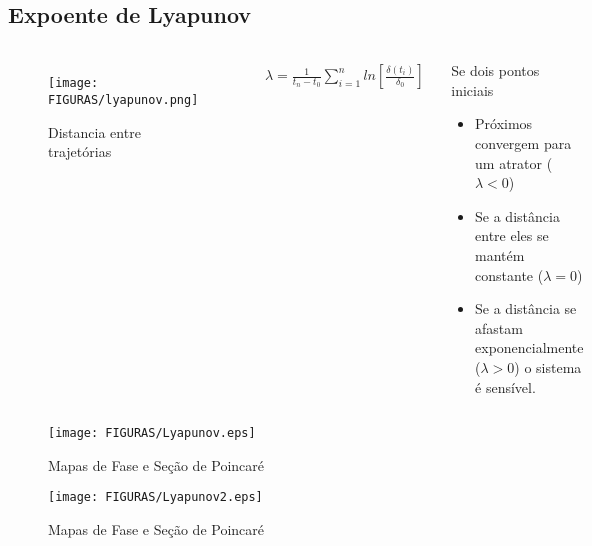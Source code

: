 \documentclass[12pt,aspectratio=169]{beamer}
\begin{document}
\subsection{Expoente de Lyapunov}
\begin{frame}
\begin{columns}
\begin{figure}[h]
\centering
\texttt{[image: FIGURAS/lyapunov.png]} 
\caption{Distancia entre trajetórias}
\label{fig:03}
\end{figure}
\begin{eqnarray}
\lambda = \frac{1}{t_n-t_0}\sum^{n}_{i=1}ln\left[ \frac{\delta(t_i)}{\delta_0} \right]
\end{eqnarray}
\begin{block}{Se dois pontos iniciais}
\begin{itemize}
    \item Próximos convergem para um atrator ($\lambda < 0$)
    \item Se a distância entre eles se mantém constante ($\lambda = 0$)
    \item Se a distância se afastam exponencialmente ($\lambda > 0$) o sistema é sensível.
\end{itemize}
\end{block}
\end{columns}
\end{frame}



\begin{frame}{}
\begin{figure}[h]
\centering
\texttt{[image: FIGURAS/Lyapunov.eps]} 
\caption{Mapas de Fase e Seção de Poincaré}
\label{fig:03}
\end{figure}
\end{frame}
\begin{frame}
\begin{figure}[h]
\centering
\texttt{[image: FIGURAS/Lyapunov2.eps]} 
\caption{Mapas de Fase e Seção de Poincaré}
\label{fig:03}
\end{figure}
\end{frame}
\end{document}
